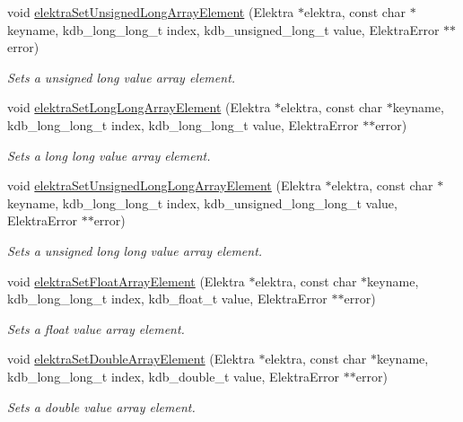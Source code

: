 \begin{DoxyCompactItemize}
void \hyperlink{group__highlevel_ga074028aab60ec3dad24940c344c9fd05}{elektra\+Set\+Unsigned\+Long\+Array\+Element} (Elektra $\ast$elektra, const char $\ast$keyname, kdb\+\_\+long\+\_\+long\+\_\+t index, kdb\+\_\+unsigned\+\_\+long\+\_\+t value, Elektra\+Error $\ast$$\ast$error)
\begin{DoxyCompactList}\small\item\em Sets a unsigned long value array element. \end{DoxyCompactList}\item 
void \hyperlink{group__highlevel_ga7f017b31c2cada6f5739fda082404f80}{elektra\+Set\+Long\+Long\+Array\+Element} (Elektra $\ast$elektra, const char $\ast$keyname, kdb\+\_\+long\+\_\+long\+\_\+t index, kdb\+\_\+long\+\_\+long\+\_\+t value, Elektra\+Error $\ast$$\ast$error)
\begin{DoxyCompactList}\small\item\em Sets a long long value array element. \end{DoxyCompactList}\item 
void \hyperlink{group__highlevel_gaf2096b0f3a20ca593daf5783a75e7327}{elektra\+Set\+Unsigned\+Long\+Long\+Array\+Element} (Elektra $\ast$elektra, const char $\ast$keyname, kdb\+\_\+long\+\_\+long\+\_\+t index, kdb\+\_\+unsigned\+\_\+long\+\_\+long\+\_\+t value, Elektra\+Error $\ast$$\ast$error)
\begin{DoxyCompactList}\small\item\em Sets a unsigned long long value array element. \end{DoxyCompactList}\item 
void \hyperlink{group__highlevel_ga64cdd0807210248d165e26f3a148e487}{elektra\+Set\+Float\+Array\+Element} (Elektra $\ast$elektra, const char $\ast$keyname, kdb\+\_\+long\+\_\+long\+\_\+t index, kdb\+\_\+float\+\_\+t value, Elektra\+Error $\ast$$\ast$error)
\begin{DoxyCompactList}\small\item\em Sets a float value array element. \end{DoxyCompactList}\item 
void \hyperlink{group__highlevel_gaeabf156194ace0dd75e95d2b23990fbb}{elektra\+Set\+Double\+Array\+Element} (Elektra $\ast$elektra, const char $\ast$keyname, kdb\+\_\+long\+\_\+long\+\_\+t index, kdb\+\_\+double\+\_\+t value, Elektra\+Error $\ast$$\ast$error)
\begin{DoxyCompactList}\small\item\em Sets a double value array element. \end{DoxyCompactList}\item 
$$
\end{DoxyCompactItemize}
